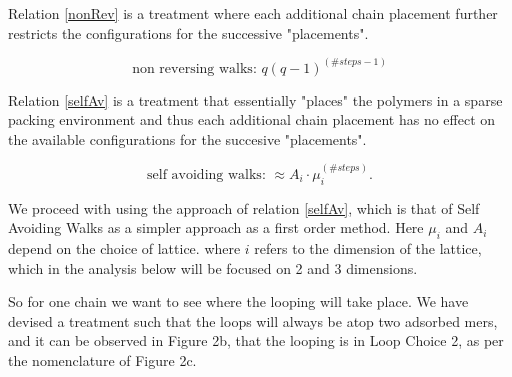 \documentclass[10pt,letterpaper]{article}
\begin{document}


\noindent Relation \ref{nonRev} is a treatment %
where each additional chain placement further restricts the configurations for the successive "placements". 

\begin{equation}
    \boxed{
	    \text{non reversing walks:  } q(q-1)^{(\#steps-1)}
	 }
	\label{nonRev}
\end{equation}

\noindent Relation \ref{selfAv} is a treatment that essentially "places" the polymers in a sparse packing environment and thus each additional chain placement has no effect on the available configurations for the succesive "placements".

\begin{equation}
    \boxed{
	    \text{self avoiding walks:  } \approx A_i\cdot\mu_i^{(\#steps)}.
    }
	\label{selfAv}
\end{equation}

\noindent We proceed with using the approach of relation \ref{selfAv}, which is that of Self Avoiding Walks as a simpler approach as a first order method. Here $\mu_i$ and $A_i$ depend on the choice of lattice\cite{Chen2002,Madras2013}. where $i$ refers to the dimension of the lattice, which in the analysis below will be focused on 2 and 3 dimensions.


\noindent So for one chain we want to see where the looping will take place. We have devised a treatment such that the loops will always be atop two adsorbed mers, and it can be observed in Figure 2b, that the looping is in Loop Choice 2, as per the nomenclature of Figure 2c.
\end{document}
